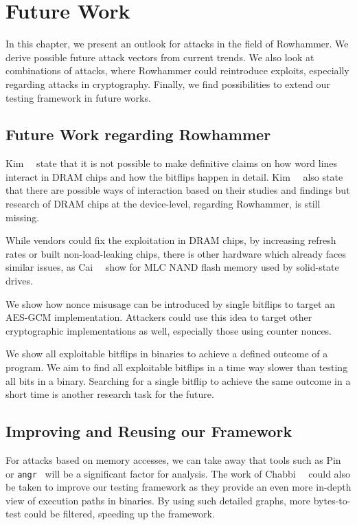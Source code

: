 \chapter{Future Work}\label{sec:futurework}

In this chapter, we present an outlook for attacks in the field of Rowhammer. We
derive possible future attack vectors from current trends. We also look at
combinations of attacks, where Rowhammer could reintroduce exploits, especially
regarding attacks in cryptography. Finally, we find possibilities to extend our
testing framework in future works.

\section{Future Work regarding Rowhammer}

Kim~\etal~\cite{rowhammergeneral} state that it is not possible to make
definitive claims on how word lines interact in DRAM chips and how the bitflips
happen in detail. Kim~\etal~\cite{rowhammergeneral} also state that there are
possible ways of interaction based on their studies and findings but research of
DRAM chips at the device-level, regarding Rowhammer, is still missing.

While vendors could fix the exploitation in DRAM chips, by increasing refresh
rates or built non-load-leaking chips, there is other hardware which already
faces similar issues, as Cai~\etal~\cite{rownandhammer} show for MLC NAND flash
memory used by solid-state drives.

We show how nonce misusage can be introduced by single bitflips to target an
AES-GCM implementation. Attackers could use this idea to target other
cryptographic implementations as well, especially those using counter nonces.

We show all exploitable bitflips in binaries to achieve a defined outcome of a
program. We aim to find all exploitable bitflips in a time way slower than
testing all bits in a binary. Searching for a single bitflip to achieve the same
outcome in a short time is another research task for the future.

\section{Improving and Reusing our Framework}

For attacks based on memory accesses, we can take away that tools such as
Pin~\cite{pintool} or \texttt{angr}~\cite{angrpaper} will be a significant
factor for analysis. The work of Chabbi~\etal~\cite{pincallpaths} could also be
taken to improve our testing framework as they provide an even more in-depth
view of execution paths in binaries. By using such detailed graphs, more
bytes-to-test could be filtered, speeding up the framework.

